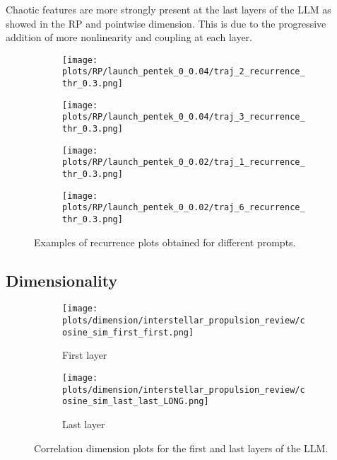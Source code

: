 \documentclass[a4paper,12pt]{article}
\begin{document}
Chaotic features are more strongly present at the last layers of the LLM as showed in the RP and pointwise dimension. This is due to the progressive addition of more nonlinearity and coupling at each layer. 

\begin{figure}[H]
    \centering
    \begin{subfigure}[b]{0.48\linewidth}
        \centering
        \texttt{[image: plots/RP/launch\_pentek\_0\_0.04/traj\_2\_recurrence\_thr\_0.3.png]}
        \caption{}
    \end{subfigure}\hfill
    \begin{subfigure}[b]{0.48\linewidth}
        \centering
        \texttt{[image: plots/RP/launch\_pentek\_0\_0.04/traj\_3\_recurrence\_thr\_0.3.png]}
        \caption{}
    \end{subfigure}
    \begin{subfigure}[b]{0.48\linewidth}
        \centering
        \texttt{[image: plots/RP/launch\_pentek\_0\_0.02/traj\_1\_recurrence\_thr\_0.3.png]}
        \caption{}
    \end{subfigure}\hfill
    \begin{subfigure}[b]{0.48\linewidth}
        \centering
        \texttt{[image: plots/RP/launch\_pentek\_0\_0.02/traj\_6\_recurrence\_thr\_0.3.png]}
        \caption{}
    \end{subfigure}
    \caption{Examples of recurrence plots obtained for different prompts.}
    \label{fig:rp_examples_2}
\end{figure}

\subsection{Dimensionality}

\begin{figure}[H]
    \centering
    \begin{subfigure}[b]{0.48\linewidth}
        \centering
        \texttt{[image: plots/dimension/interstellar\_propulsion\_review/cosine\_sim\_first\_first.png]}
        \caption{First layer}
    \end{subfigure}\hfill
    \begin{subfigure}[b]{0.48\linewidth}
        \centering
        \texttt{[image: plots/dimension/interstellar\_propulsion\_review/cosine\_sim\_last\_last\_LONG.png]}
        \caption{Last layer}
    \end{subfigure}
    \caption{Correlation dimension plots for the first and last layers of the LLM.}
    \label{fig:dim_first_last}
\end{figure}
\end{document}

